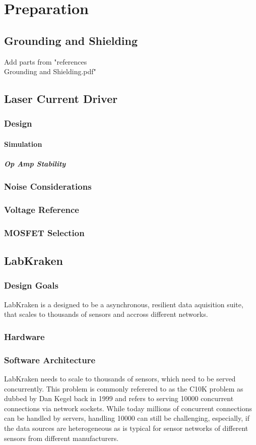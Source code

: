 \chapter{Preparation}
\section{Grounding and Shielding}
Add parts from "references\\Grounding and Shielding.pdf"
\section{Laser Current Driver}
\subsection{Design}
\subsubsection{Simulation}
\paragraph{Op Amp Stability}
\subsection{Noise Considerations}
\subsection{Voltage Reference}
\subsection{MOSFET Selection}

\section{LabKraken}
\subsection{Design Goals}
LabKraken is a designed to be a asynchronous, resilient data aquisition suite, that scales to thousands of sensors and accross different networks.
\subsection{Hardware}
\subsection{Software Architecture}
LabKraken needs to scale to thousands of sensors, which need to be served concurrently. This problem is commonly referered to as the C10K problem as dubbed by Dan Kegel back in 1999 \cite{10kProblem} and refers to serving \num{10000} concurrent connections via network sockets. While today millions of concurrent connections can be handled by servers, handling \num{10000} can still be challenging, especially, if the data sources are heterogeneous as is typical for sensor networks of different sensors from different manufacturers.

